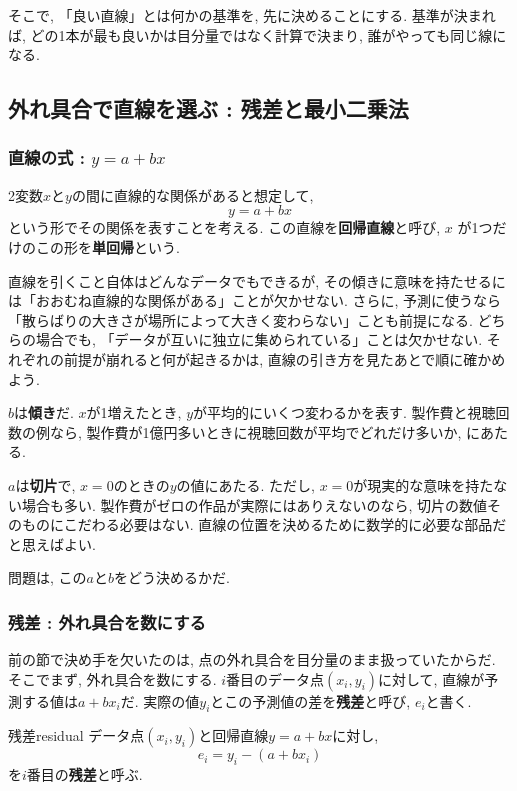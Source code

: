 そこで, 「良い直線」とは何かの基準を, 先に決めることにする.
基準が決まれば, どの1本が最も良いかは目分量ではなく計算で決まり, 誰がやっても同じ線になる.


\subsection{外れ具合で直線を選ぶ : 残差と最小二乗法}

\subsubsection*{直線の式 : \texorpdfstring{$y = a + bx$}{y = a + bx}}

2変数$x$と$y$の間に直線的な関係があると想定して,
\[
  y = a + bx
\]
という形でその関係を表すことを考える.
この直線を\textbf{回帰直線}と呼び, $x$ が1つだけのこの形を\textbf{単回帰}という.

直線を引くこと自体はどんなデータでもできるが, その傾きに意味を持たせるには「おおむね直線的な関係がある」ことが欠かせない.
さらに, 予測に使うなら「散らばりの大きさが場所によって大きく変わらない」ことも前提になる. どちらの場合でも, 「データが互いに独立に集められている」ことは欠かせない.
それぞれの前提が崩れると何が起きるかは, 直線の引き方を見たあとで順に確かめよう.

$b$は\textbf{傾き}だ.
$x$が1増えたとき, $y$が平均的にいくつ変わるかを表す.
製作費と視聴回数の例なら, 製作費が1億円多いときに視聴回数が平均でどれだけ多いか, にあたる.

$a$は\textbf{切片}で, $x = 0$のときの$y$の値にあたる.
ただし, $x = 0$が現実的な意味を持たない場合も多い.
製作費がゼロの作品が実際にはありえないのなら, 切片の数値そのものにこだわる必要はない.
直線の位置を決めるために数学的に必要な部品だと思えばよい.

問題は, この$a$と$b$をどう決めるかだ.

\subsubsection*{残差 : 外れ具合を数にする}

前の節で決め手を欠いたのは, 点の外れ具合を目分量のまま扱っていたからだ.
そこでまず, 外れ具合を数にする.
$i$番目のデータ点$(x_i, y_i)$に対して, 直線が予測する値は$a + bx_i$だ.
実際の値$y_i$とこの予測値の差を\textbf{残差}と呼び, $e_i$と書く.

\begin{defi}{残差}{residual}
データ点$(x_i, y_i)$と回帰直線$y = a + bx$に対し,
\[
  e_i = y_i - (a + bx_i)
\]
を$i$番目の\textbf{残差}と呼ぶ.
\end{defi}

